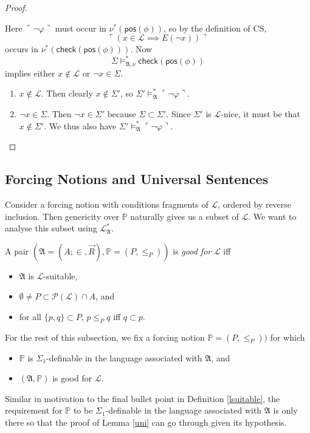 \documentclass[12pt]{article}
\numberwithin{equation}{section}
\begin{document}
\begin{proof}
\begin{enumerate}[label=Case \arabic*:, leftmargin=50pt]
    Here $\ulcorner \neg \varphi \urcorner$ must occur in $\nu^*(\mathsf{pos}(\phi))$, so by the definition of $\mathrm{CS}$, $$\ulcorner (x \in \mathcal{L} \implies E(\neg x)) \urcorner$$ occurs in $\nu^*(\mathsf{check}(\mathsf{pos}(\phi)))$. Now $$\Sigma \models^*_{\mathfrak{A}, \nu} \mathsf{check}(\mathsf{pos}(\phi))$$ implies either $x \not \in \mathcal{L}$ or $\neg x \in \Sigma$. 
    \begin{enumerate}[label=Subcase \arabic*:, leftmargin=60pt]
        \item $x \not \in \mathcal{L}$. Then clearly $x \not \in \Sigma'$, so $\Sigma' \models^*_{\mathfrak{A}} \ulcorner \neg \varphi \urcorner$.
        \item $\neg x \in \Sigma$. Then $\neg x \in \Sigma'$ because $\Sigma \subset \Sigma'$. Since $\Sigma'$ is $\mathcal{L}$-nice, it must be that $x \not \in \Sigma'$. We thus also have $\Sigma' \models^*_{\mathfrak{A}} \ulcorner \neg \varphi \urcorner$. \qedhere
    \end{enumerate}
\end{enumerate}
\end{proof}

\subsection{Forcing Notions and Universal Sentences}

Consider a forcing notion with conditions fragments of $\mathcal{L}$, ordered by reverse inclusion. Then genericity over $\mathbb{P}$ naturally gives us a subset of $\mathcal{L}$. We want to analyse this subset using $\mathcal{L}^{*}_{\mathfrak{A}}$.

\begin{defi}
A pair $(\mathfrak{A} = (A; \in, \Vec{R}), \mathbb{P} = (P, \leq_P))$ is \emph{good for} $\mathcal{L}$ iff 
\begin{itemize}
    \item $\mathfrak{A}$ is $\mathcal{L}$-suitable,
    \item $\emptyset \neq P \subset \mathcal{P}(\mathcal{L}) \cap A$, and
    \item for all $\{p, q\} \subset P$, $p \leq_P q$ iff $q \subset p$.
\end{itemize}
\end{defi}

For the rest of this subsection, we fix a forcing notion $\mathbb{P} = (P, \leq_P))$ for which
\begin{itemize}
    \item $\mathbb{P}$ is $\Sigma_1$-definable in the language associated with $\mathfrak{A}$, and
    \item $(\mathfrak{A}, \mathbb{P})$ is good for $\mathcal{L}$.
\end{itemize}
Similar in motivation to the final bullet point in Definition \ref{lsuitable}, the requirement for $\mathbb{P}$ to be $\Sigma_1$-definable in the language associated with $\mathfrak{A}$ is only there so that the proof of Lemma \ref{uni} can go through given its hypothesis.
\end{document}
